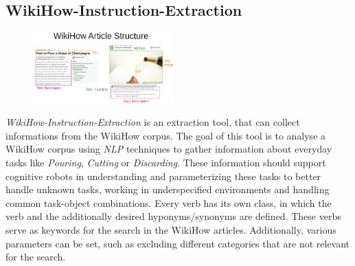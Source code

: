 	\subsection{WikiHow-Instruction-Extraction}
	\label{sec:WikiHow}
	
	\begin{figure}
        \centering
        \includegraphics[width=0.48\textwidth]{Graphics/WikiHow Article Structure.png}
    \end{figure}
	\textit{WikiHow-Instruction-Extraction} \cite{wikihow-extraction}  is an extraction tool, that can collect informations from the WikiHow \cite{wikihow} corpus. 
	The goal of this tool is to analyse a WikiHow corpus using \textit{NLP} techniques to gather information about everyday tasks like \textit{Pouring}, \textit{Cutting} or \textit{Discarding}. 
	These information should support cognitive robots in understanding and parameterizing these tasks to better handle unknown tasks, working in underspecified environments and handling common task-object combinations.
	Every verb has its own class, in which the verb and the additionally desired hyponyms/synonyms are defined. These verbs serve as keywords for the search in the WikiHow \cite{wikihow} articles. Additionally, various parameters can be set, such as excluding different categories that are not relevant for the search.